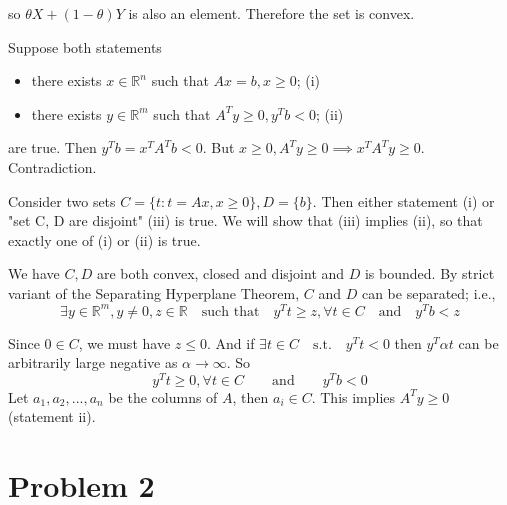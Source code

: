 \documentclass[12pt,letterpaper]{article}
\begin{document}
\begin{alphalist}
    so $\theta X + (1- \theta)Y$ is also an element. Therefore the set is convex.


\item
    Suppose both statements
    \begin{itemize}
        \item there exists $x \in \mathbb{R}^n$ such that $Ax = b, x \ge 0$; (i)
        \item there exists $y \in \mathbb{R}^m$ such that $A^Ty \ge 0, y^Tb <
            0$; (ii)
    \end{itemize}

    are true. Then $y^Tb = x^TA^Tb < 0$. But $x \ge 0, A^Ty \ge 0 \implies
    x^TA^Ty \ge 0$. Contradiction.

    Consider two sets $C = \{t : t = Ax, x \ge 0\}, D = \{ b \}$. Then either
    statement (i) or "set C, D are disjoint" (iii) is true. We will show
    that (iii) implies (ii), so that exactly one of (i) or (ii) is true.

    We have $C, D$ are both convex, closed and disjoint and $D$ is bounded. By
    strict variant of the Separating Hyperplane Theorem, $C$ and $D$ can be
    separated; i.e.,
    \[
        \exists y \in \mathbb{R}^m, y \ne 0, z \in \mathbb{R} \quad \text{such
        that}\quad y^Tt \ge z, \forall t \in C \quad \text{and} \quad y^Tb < z
    \]

    Since $0 \in C$, we must have $z \le 0$. And if $\exists t \in C \quad
    \text{s.t.} \quad y^Tt < 0$ then $y^T\alpha{}t$ can be arbitrarily large negative
    as $\alpha \to \infty$. So
    \[
        y^Tt \ge 0, \forall t \in C  \qquad \text{and} \qquad y^Tb < 0
    \]
    Let $a_1, a_2,..., a_n$ be the columns of $A$, then $a_i \in C$. This
    implies $A^Ty \ge 0$ (statement ii).
\end{alphalist}

\newpage
\section*{Problem 2}
\end{document}
